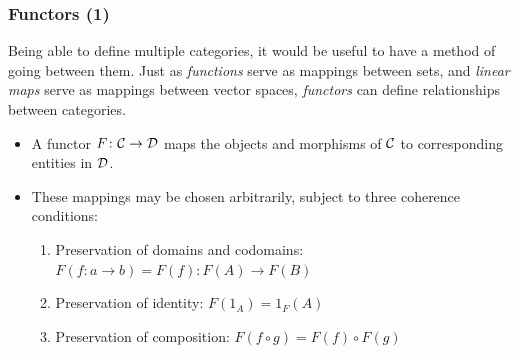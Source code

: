 \documentclass{beamer}
\numberwithin{figure}{section}
\newcommand{\arbcat}[1]{\ensuremath\mathcal{#1}}
\begin{document}
\begin{frame}
        \frametitle{Functors (1)}
        Being able to define multiple categories, it would be useful to have a
        method of going between them. Just as \emph{functions} serve as mappings
        between sets, and \emph{linear maps} serve as mappings between vector
        spaces, \emph{functors} can define relationships between categories.
        \pause
        \begin{itemize}
                \item A functor $F \colon \arbcat{C} \to \arbcat{D}$ maps the
                        objects and morphisms of $\arbcat{C}$ to corresponding
                        entities in $\arbcat{D}$.
                \item These mappings may be chosen arbitrarily, subject to three
                        coherence conditions:
                        \begin{enumerate}
                                \item Preservation of domains and codomains:
                                        $F(f \colon a \to b) = F(f) \colon F(A)
                                        \to F(B)$
                                \item Preservation of identity:
                                        $F(1_A) = 1_F(A)$
                                \item Preservation of composition:
                                        $F(f \circ g) = F(f) \circ F(g)$
                        \end{enumerate}
        \end{itemize}
\end{frame}
\end{document}
